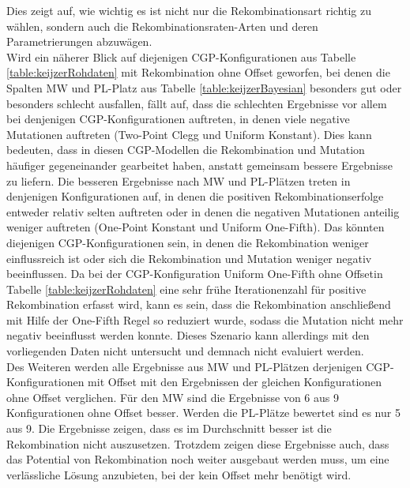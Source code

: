 Dies zeigt auf, wie wichtig es ist nicht nur die Rekombinationsart richtig zu wählen, sondern auch die Rekombinationsraten-Arten und deren Parametrierungen abzuwägen.\\
Wird ein näherer Blick auf diejenigen CGP-Konfigurationen aus Tabelle \ref{table:keijzerRohdaten} mit Rekombination ohne Offset geworfen, bei denen die Spalten MW und PL-Platz aus Tabelle \ref{table:keijzerBayesian} besonders gut oder besonders schlecht ausfallen, fällt auf, dass die schlechten Ergebnisse vor allem bei denjenigen CGP-Konfigurationen auftreten, in denen viele negative Mutationen auftreten (Two-Point Clegg und Uniform Konstant).
Dies kann bedeuten, dass in diesen CGP-Modellen die Rekombination und Mutation häufiger gegeneinander gearbeitet haben, anstatt gemeinsam bessere Ergebnisse zu liefern.
Die besseren Ergebnisse nach MW und PL-Plätzen treten in denjenigen Konfigurationen auf, in denen die positiven Rekombinationserfolge entweder relativ selten auftreten oder in denen die negativen Mutationen anteilig weniger auftreten (One-Point Konstant und Uniform One-Fifth).
Das könnten diejenigen CGP-Konfigurationen sein, in denen die Rekombination weniger einflussreich ist oder sich die Rekombination und Mutation weniger negativ beeinflussen.
Da bei der CGP-Konfiguration \glqq Uniform One-Fifth ohne Offset\grqq\space in Tabelle \ref{table:keijzerRohdaten} eine sehr frühe Iterationenzahl für positive Rekombination erfasst wird, kann es sein, dass die Rekombination anschließend mit Hilfe der One-Fifth Regel so reduziert wurde, sodass die Mutation nicht mehr negativ beeinflusst werden konnte.
Dieses Szenario kann allerdings mit den vorliegenden Daten nicht untersucht und demnach nicht evaluiert werden.\\
Des Weiteren werden alle Ergebnisse aus MW und PL-Plätzen derjenigen CGP-Kon\-fi\-gu\-ra\-tionen mit Offset mit den Ergebnissen der gleichen Konfigurationen ohne Offset verglichen.
Für den MW sind die Ergebnisse von 6 aus 9 Konfigurationen ohne Offset besser.
Werden die PL-Plätze bewertet sind es nur 5 aus 9.
Die Ergebnisse zeigen, dass es im Durchschnitt besser ist die Rekombination nicht auszusetzen.
Trotzdem zeigen diese Ergebnisse auch, dass das Potential von Rekombination noch weiter ausgebaut werden muss, um eine verlässliche Lösung anzubieten, bei der kein Offset mehr benötigt wird.
